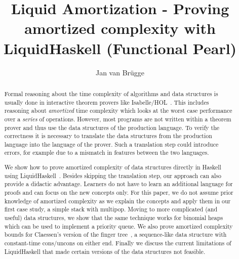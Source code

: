 \documentclass[sigplan,screen,review,anonymous]{acmart}
\begin{document}
\title{Liquid Amortization - Proving amortized complexity with LiquidHaskell (Functional Pearl)}

\author{Jan van Brügge}


\begin{abstract}
Formal reasoning about the time complexity of algorithms and data structures is usually done in interactive theorem provers like Isabelle/HOL~\cite{isabelle}. This includes reasoning about \textit{amortized} time complexity which looks at the worst case performance over a \textit{series} of operations. However, most programs are not written within a theorem prover and thus use the data structures of the production language. To verify the correctness it is necessary to translate the data structures from the production language into the language of the prover. Such a translation step could introduce errors, for example due to a mismatch in features between the two languages.

We show how to prove amortized complexity of data structures directly in Haskell using LiquidHaskell~\cite{liquidhaskell}. Besides skipping the translation step, our approach can also provide a didactic advantage. Learners do not have to learn an additional language for proofs and can focus on the new concepts only. For this paper, we do not assume prior knowledge of amortized complexity as we explain the concepts and apply them in our first case study, a simple stack with multipop. Moving to more complicated (and useful) data structures, we show that the same technique works for binomial heaps which can be used to implement a priority queue. We also prove amortized complexity bounds for Claessen's version of the finger tree~\cite{fingertrees_new}, a sequence-like data structure with constant-time cons/uncons on either end. Finally we discuss the current limitations of LiquidHaskell that made certain versions of the data structures not feasible.
\end{abstract}
\end{document}
